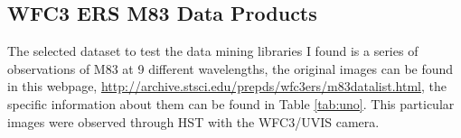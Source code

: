 \documentclass[11pt,fleqn]{book} %
\begin{document}
																																																																																																																																																																					\subsection{WFC3 ERS M83 Data Products}
																																																																																																																																																																					    The selected dataset to test the data mining libraries I found is a series of observations of M83 at 9 different wavelengths, the original images can be found in this webpage, \url{http://archive.stsci.edu/prepds/wfc3ers/m83datalist.html}, the specific information about them can be found in Table \ref{tab:uno}. This particular images were observed through HST with the WFC3/UVIS camera.
																																																																																																																																																																					        
\end{document}
